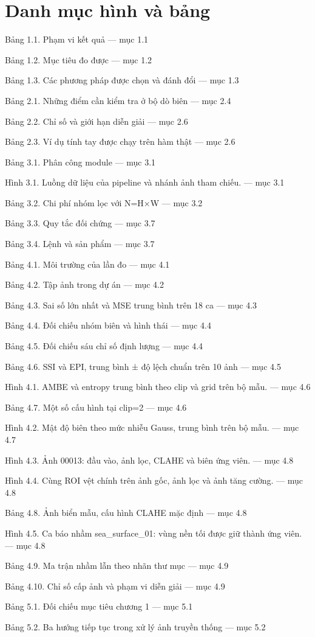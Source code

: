 \documentclass[13pt,a4paper]{extreport}
\begin{document}
\section*{Danh mục hình và bảng}
Bảng 1.1. Phạm vi kết quả — mục 1.1
\par
Bảng 1.2. Mục tiêu đo được — mục 1.2
\par
Bảng 1.3. Các phương pháp được chọn và đánh đổi — mục 1.3
\par
Bảng 2.1. Những điểm cần kiểm tra ở bộ dò biên — mục 2.4
\par
Bảng 2.2. Chỉ số và giới hạn diễn giải — mục 2.6
\par
Bảng 2.3. Ví dụ tính tay được chạy trên hàm thật — mục 2.6
\par
Bảng 3.1. Phân công module — mục 3.1
\par
Hình 3.1. Luồng dữ liệu của pipeline và nhánh ảnh tham chiếu. — mục 3.1
\par
Bảng 3.2. Chi phí nhóm lọc với N=H×W — mục 3.2
\par
Bảng 3.3. Quy tắc đối chứng — mục 3.7
\par
Bảng 3.4. Lệnh và sản phẩm — mục 3.7
\par
Bảng 4.1. Môi trường của lần đo — mục 4.1
\par
Bảng 4.2. Tập ảnh trong dự án — mục 4.2
\par
Bảng 4.3. Sai số lớn nhất và MSE trung bình trên 18 ca — mục 4.3
\par
Bảng 4.4. Đối chiếu nhóm biên và hình thái — mục 4.4
\par
Bảng 4.5. Đối chiếu sáu chỉ số định lượng — mục 4.4
\par
Bảng 4.6. SSI và EPI, trung bình ± độ lệch chuẩn trên 10 ảnh — mục 4.5
\par
Hình 4.1. AMBE và entropy trung bình theo clip và grid trên bộ mẫu. — mục 4.6
\par
Bảng 4.7. Một số cấu hình tại clip=2 — mục 4.6
\par
Hình 4.2. Mật độ biên theo mức nhiễu Gauss, trung bình trên bộ mẫu. — mục 4.7
\par
Hình 4.3. Ảnh 00013: đầu vào, ảnh lọc, CLAHE và biên ứng viên. — mục 4.8
\par
Hình 4.4. Cùng ROI vệt chính trên ảnh gốc, ảnh lọc và ảnh tăng cường. — mục 4.8
\par
Bảng 4.8. Ảnh biển mẫu, cấu hình CLAHE mặc định — mục 4.8
\par
Hình 4.5. Ca báo nhầm sea\_surface\_01: vùng nền tối được giữ thành ứng viên. — mục 4.8
\par
Bảng 4.9. Ma trận nhầm lẫn theo nhãn thư mục — mục 4.9
\par
Bảng 4.10. Chỉ số cấp ảnh và phạm vi diễn giải — mục 4.9
\par
Bảng 5.1. Đối chiếu mục tiêu chương 1 — mục 5.1
\par
Bảng 5.2. Ba hướng tiếp tục trong xử lý ảnh truyền thống — mục 5.2
\par
\clearpage
\end{document}
